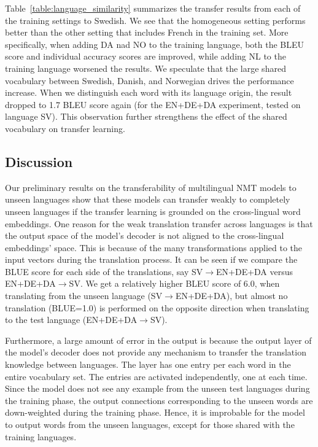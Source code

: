 \documentclass[11pt,a4paper]{article}
\begin{document}
Table~\ref{table:language_similarity} summarizes the transfer results from each of the training settings to Swedish. 
We see that the homogeneous setting performs better than the other setting that includes French in the training set. 
More specifically, when adding DA nad NO to the training language, both the BLEU score and individual accuracy scores are improved, while adding NL to the training language worsened the results. We speculate that the large shared vocabulary between Swedish, Danish, and Norwegian drives the performance increase. 
When we distinguish each word with its language origin, the result dropped to 1.7 BLEU score again (for the EN+DE+DA experiment, tested on language SV).
This observation further strengthens the effect of the shared vocabulary on transfer learning. 

\subsection{Discussion}
Our preliminary results on the transferability of multilingual NMT models to unseen languages show that these models can transfer weakly to completely unseen languages if the transfer learning is grounded on the cross-lingual word embeddings. 
One reason for the weak translation transfer across languages is that the output space of the model's decoder is not aligned to the cross-lingual embeddings' space. This is because of the many transformations applied to the input vectors during the translation process. It can be seen if we compare the BLUE score for each side of the translations, say SV$\to$EN+DE+DA versus EN+DE+DA$\to$SV. We get a relatively higher BLEU score of 6.0, when translating from the unseen language (SV$\to$EN+DE+DA), but almost no translation (BLUE=1.0) is performed on the opposite direction when translating to the test language (EN+DE+DA$\to$SV). 

Furthermore, a large amount of error in the output is because the output layer of the model's decoder does not provide any mechanism to transfer the translation knowledge between languages. The layer has one entry per each word in the entire vocabulary set. The entries are activated independently, one at each time. Since the model does not see any example from the unseen test languages during the training phase, the output connections corresponding to the unseen words are down-weighted during the training phase. Hence, it is improbable for the model to output words from the unseen languages, except for those shared with the training languages. %
\end{document}
